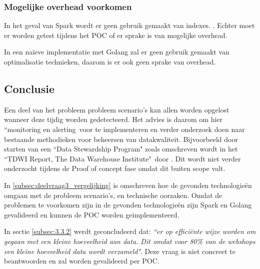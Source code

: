 \subsubsection{\textbf{Mogelijke overhead voorkomen}}

In het geval van Spark wordt er geen gebruik gemaakt van indexes. \parencite{armbrust2015spark}. Echter moet er worden getest tijdens het POC of er sprake is van mogelijke overhead.

In een naïeve implementatie met Golang zal er geen gebruik gemaakt van optimalisatie technieken, daarom is er ook geen sprake van overhead.



    
\subsection{Conclusie}

Een deel van het probleem probleem scenario's kan allen worden opgelost wanneer deze tijdig worden gedetecteerd. Het advies is daarom om hier ``monitoring en alerting\ voor te implementeren en verder onderzoek doen naar bestaande methodieken voor beheersen van datakwaliteit. Bijvoorbeeld door starten van een ``Data Stewardship Program" zoals omschreven wordt in het ``TDWI Report, The Data Warehouse Institute"\ door  \textcite{eckerson2002data}. Dit wordt niet verder onderzocht tijdens de Proof of concept fase omdat dit buiten scope valt.

In \ref{subsec:deelvraag3_vergelijking} is omschreven hoe de gevonden technologieën omgaan met de probleem scenario's, en technische oorzaken. 
Omdat de problemen te voorkomen zijn in de gevonden technologieën zijn Spark en Golang gevalideerd en kunnen de POC worden geimplementeerd.

In sectie \ref{subsec:3.3.2} werdt geconcludeerd dat: \textit{``er op efficiënte wijze worden om gegaan met een kleine hoeveelheid aan data. Dit omdat voor 80\% van de webshops een kleine hoeveelheid data wordt verzameld"}. Deze vraag is niet concreet te beantwoorden en zal worden gevalideerd per POC.